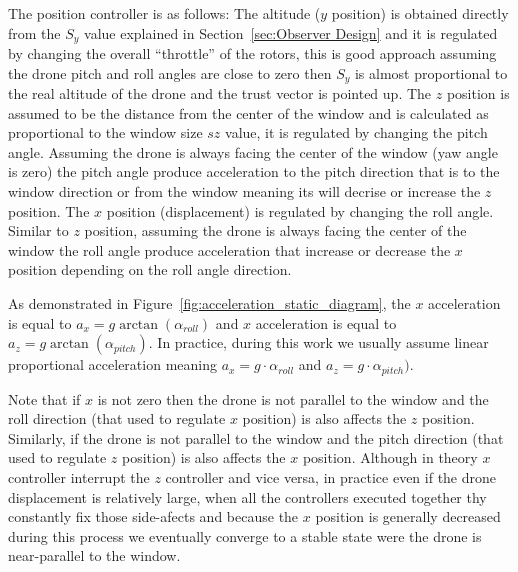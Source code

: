 \documentclass[ twoside, 12pt ]{article}
\begin{document}
The position controller is as follows:
The altitude ($y$ position) is obtained directly from the $S_y$ value explained in Section~\ref{sec:Observer Design} and it is regulated by changing the overall ``throttle'' of the rotors, this is good approach assuming the drone pitch and roll angles are close to zero then $S_y$ is almost proportional to the real altitude of the drone and the trust vector is pointed up.
The $z$ position is assumed to be the distance from the center of the window and is calculated as proportional to the window size $sz$ value, it is regulated by changing the pitch angle. Assuming the drone is always facing the center of the window (yaw angle is zero) the pitch angle produce acceleration to the pitch direction that is to the window direction or from the window meaning its will decrise or increase the $z$ position.
The $x$ position (displacement) is regulated by changing the roll angle. Similar to $z$ position, assuming the drone is always facing the center of the window the roll angle produce acceleration that increase or decrease the $x$ position depending on the roll angle direction.

As demonstrated in Figure~\ref{fig:acceleration_static_diagram}, the $x$ acceleration is equal to $a_x=g \arctan(\alpha_{roll})$ and $x$ acceleration is equal to $a_z=g \arctan(\alpha_{pitch})$. 
In practice, during this work we usually assume linear proportional acceleration meaning $a_x=g \cdot \alpha_{roll}$ and $a_z=g \cdot \alpha_{pitch})$.

Note that if $x$ is not zero then the drone is not parallel to the window and the roll direction (that used to regulate $x$ position) is also affects the $z$ position.
Similarly, if the drone is not parallel to the window and the pitch direction (that used to regulate $z$ position) is also affects the $x$ position.
Although in theory $x$ controller interrupt the $z$ controller and vice versa, in practice even if the drone displacement is relatively large, when all the controllers executed together thy constantly fix those side-afects and because the $x$ position is generally decreased during this process we eventually converge to a stable state were the drone is near-parallel to the window.
\end{document}
